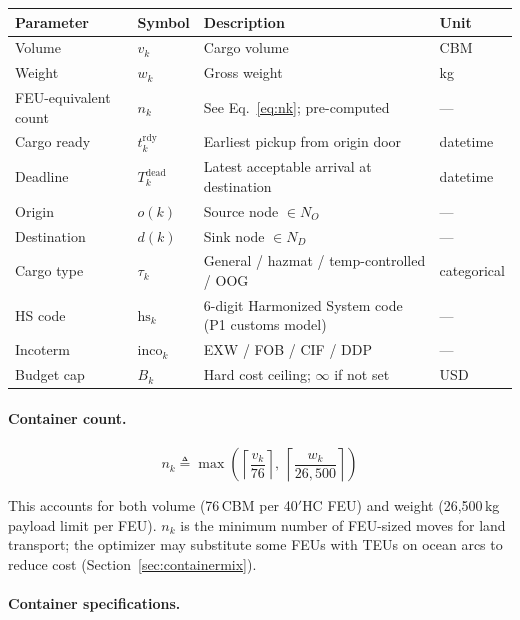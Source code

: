 \documentclass[11pt,a4paper]{article}
\newcommand{\ceil}[1]{\left\lceil #1 \right\rceil}
\newcommand{\defeq}{\triangleq}
\theoremstyle{definition}
\begin{document}
\begin{center}
\begin{tabular}{llp{6cm}l}
\toprule
Parameter & Symbol & Description & Unit \\
\midrule
Volume & $v_k$ & Cargo volume & CBM \\
Weight & $w_k$ & Gross weight & kg \\
FEU-equivalent count & $n_k$ & See Eq.~\eqref{eq:nk}; pre-computed & — \\
Cargo ready & $t_k^{\text{rdy}}$ & Earliest pickup from origin door & datetime \\
Deadline & $T_k^{\text{dead}}$ & Latest acceptable arrival at destination & datetime \\
Origin & $o(k)$ & Source node $\in N_O$ & — \\
Destination & $d(k)$ & Sink node $\in N_D$ & — \\
Cargo type & $\tau_k$ & General / hazmat / temp-controlled / OOG & categorical \\
HS code & $\text{hs}_k$ & 6-digit Harmonized System code (P1 customs model) & — \\
Incoterm & $\text{inco}_k$ & EXW / FOB / CIF / DDP & — \\
Budget cap & $B_k$ & Hard cost ceiling; $\infty$ if not set & USD \\
\bottomrule
\end{tabular}
\end{center}

\paragraph{Container count.}
\begin{equation}
  n_k \defeq \max\!\left(\ceil{\frac{v_k}{76}},\ \ceil{\frac{w_k}{26{,}500}}\right)
  \label{eq:nk}
\end{equation}

This accounts for both volume (76\,CBM per 40$'$HC FEU) and weight (26,500\,kg payload limit
per FEU). $n_k$ is the minimum number of FEU-sized moves for land transport; the optimizer
may substitute some FEUs with TEUs on ocean arcs to reduce cost (Section~\ref{sec:containermix}).

\paragraph{Container specifications.}
\end{document}
